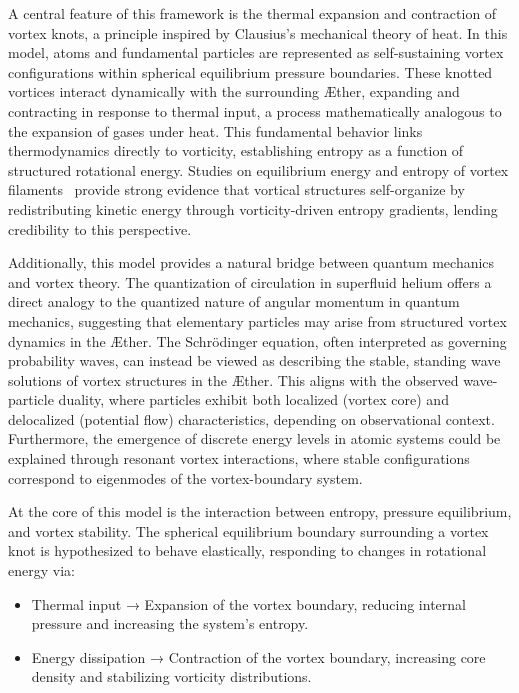 \documentclass[a4paper,10pt]{article}
\begin{document}
A central feature of this framework is the thermal expansion and contraction of vortex knots, a principle inspired by Clausius's mechanical theory of heat. In this model, atoms and fundamental particles are represented as self-sustaining vortex configurations within spherical equilibrium pressure boundaries. These knotted vortices interact dynamically with the surrounding Æther, expanding and contracting in response to thermal input, a process mathematically analogous to the expansion of gases under heat. This fundamental behavior links thermodynamics directly to vorticity, establishing entropy as a function of structured rotational energy. Studies on equilibrium energy and entropy of vortex filaments~\cite{belik2023} provide strong evidence that vortical structures self-organize by redistributing kinetic energy through vorticity-driven entropy gradients, lending credibility to this perspective.

Additionally, this model provides a natural bridge between quantum mechanics and vortex theory. The quantization of circulation in superfluid helium offers a direct analogy to the quantized nature of angular momentum in quantum mechanics, suggesting that elementary particles may arise from structured vortex dynamics in the Æther. The Schrödinger equation, often interpreted as governing probability waves, can instead be viewed as describing the stable, standing wave solutions of vortex structures in the Æther. This aligns with the observed wave-particle duality, where particles exhibit both localized (vortex core) and delocalized (potential flow) characteristics, depending on observational context. Furthermore, the emergence of discrete energy levels in atomic systems could be explained through resonant vortex interactions, where stable configurations correspond to eigenmodes of the vortex-boundary system.

At the core of this model is the interaction between entropy, pressure equilibrium, and vortex stability. The spherical equilibrium boundary surrounding a vortex knot is hypothesized to behave elastically, responding to changes in rotational energy via:

\begin{itemize}
    \item Thermal input → Expansion of the vortex boundary, reducing internal pressure and increasing the system's entropy.
    \item Energy dissipation → Contraction of the vortex boundary, increasing core density and stabilizing vorticity distributions.
\end{itemize}
\end{document}
